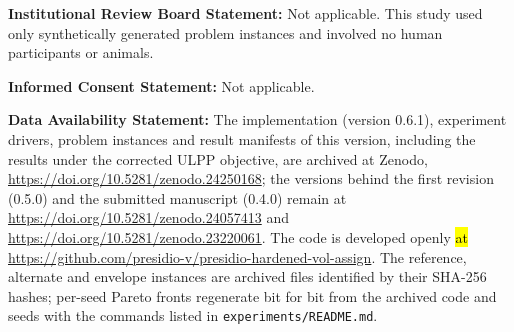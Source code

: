 \documentclass[systems,article,accept,moreauthors,pdftex]{Definitions/mdpi}
\providecommand{\dataavailability}[1]{\vspace{6pt}\noindent\textbf{Data Availability Statement:} #1\par}
\providecommand{\institutionalreview}[1]{\vspace{6pt}\noindent\textbf{Institutional Review Board Statement:} #1\par}
\providecommand{\informedconsent}[1]{\vspace{6pt}\noindent\textbf{Informed Consent Statement:} #1\par}
\begin{document}


\institutionalreview{Not applicable. This study used only synthetically generated problem instances and involved no human participants or animals.}

\informedconsent{Not applicable.}

\dataavailability{The implementation (version 0.6.1), experiment drivers, problem instances and result manifests of this version, including the results under the corrected ULPP objective, are archived at Zenodo, \url{https://doi.org/10.5281/zenodo.24250168}; the versions behind the first revision (0.5.0) and the submitted manuscript (0.4.0) remain at \url{https://doi.org/10.5281/zenodo.24057413} and \url{https://doi.org/10.5281/zenodo.23220061}. The code is developed openly \hl{at} %
 \url{https://github.com/presidio-v/presidio-hardened-vol-assign}. The reference, alternate and envelope instances are archived files identified by their SHA-256 hashes; per-seed Pareto fronts regenerate bit for bit from the archived code and seeds with the commands listed in \texttt{experiments/README.md}.}
\newpage
{}


\appendixstart
\appendix
\end{document}
